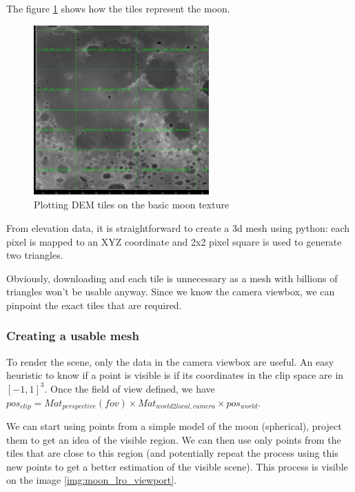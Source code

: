 \documentclass[14pt]{article}
\begin{document}
The figure \ref{img:moon_dem_tiles} shows how the tiles represent the moon.
\begin{figure}[H]
  \centering
  \includegraphics[width=0.6\textwidth]{./data/moon_dem_tiles.png}
  \caption{Plotting DEM tiles on the basic moon texture}
  \label{img:moon_dem_tiles}
\end{figure}

From elevation data, it is straightforward to create a 3d mesh using python: each pixel is mapped to an XYZ coordinate and 2x2 pixel square is used to generate two triangles.


Obviously, downloading and each tile is unnecessary as a mesh with billions of triangles won't be usable anyway. Since we know the camera viewbox, we can pinpoint the exact tiles that are required.

\subsubsection{Creating a usable mesh}

To render the scene, only the data in the camera viewbox are useful. An easy heuristic to know if a point is visible is if its coordinates in the clip space are in $[-1,1]^3$.
Once the field of view defined, we have $pos_{clip} = Mat_{perspective}(fov) \times Mat_{world2local,camera} \times pos_{world}$.

We can start using points from a simple model of the moon (spherical), project them to get an idea of the visible region. We can then use only points from the tiles that are close to this region (and potentially repeat the process using this new points to get a better estimation of the visible scene). This process is visible on the image \ref{img:moon_lro_viewport}.
\end{document}
